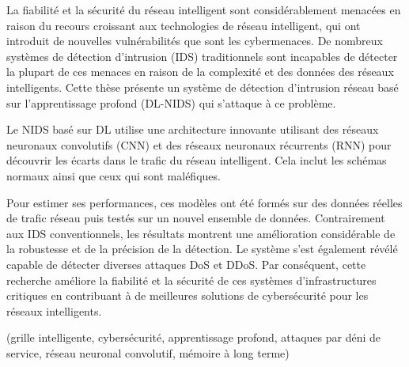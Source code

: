 %	
%	
%




\begin{abstractFr}


La fiabilité et la sécurité du réseau intelligent sont considérablement menacées en raison du recours croissant aux technologies de réseau intelligent, qui ont introduit de nouvelles vulnérabilités que sont les cybermenaces. De nombreux systèmes de détection d'intrusion (IDS) traditionnels sont incapables de détecter la plupart de ces menaces en raison de la complexité et des données des réseaux intelligents. Cette thèse présente un système de détection d'intrusion réseau basé sur l'apprentissage profond (DL-NIDS) qui s'attaque à ce problème.

  Le NIDS basé sur DL utilise une architecture innovante utilisant des réseaux neuronaux convolutifs (CNN) et des réseaux neuronaux récurrents (RNN) pour découvrir les écarts dans le trafic du réseau intelligent. Cela inclut les schémas normaux ainsi que ceux qui sont maléfiques.

  Pour estimer ses performances, ces modèles ont été formés sur des données réelles de trafic réseau puis testés sur un nouvel ensemble de données. Contrairement aux IDS conventionnels, les résultats montrent une amélioration considérable de la robustesse et de la précision de la détection. Le système s’est également révélé capable de détecter diverses attaques DoS et DDoS. Par conséquent, cette recherche améliore la fiabilité et la sécurité de ces systèmes d’infrastructures critiques en contribuant à de meilleures solutions de cybersécurité pour les réseaux intelligents.


  \end{abstractFr}



  \begin{keywordsEn}
	(grille intelligente, cybersécurité, apprentissage profond, attaques par déni de service, réseau neuronal convolutif, mémoire à long terme)
\end{keywordsEn}

